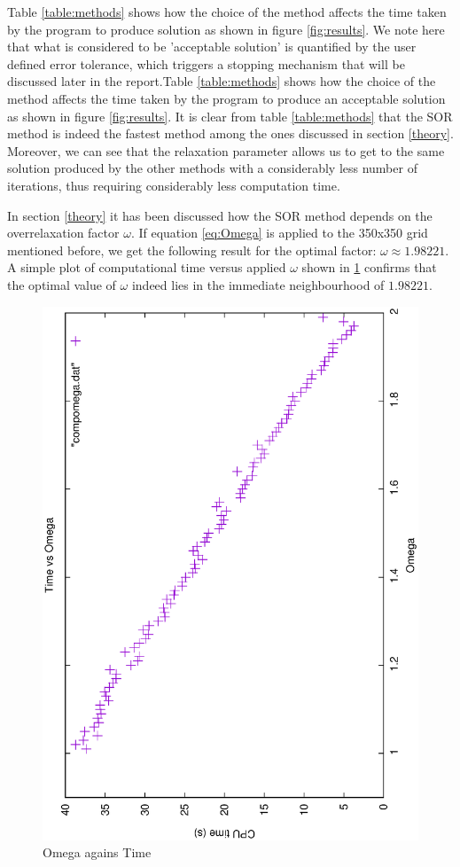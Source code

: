 \documentclass[a4paper]{article}
\begin{document}
Table \ref{table:methods} shows how the choice of the method affects the time taken by the program to produce solution as shown in figure \ref{fig:results}. We note here that what is considered to be 'acceptable solution' is quantified by the user defined error tolerance, which triggers a stopping mechanism that will be discussed later in the report.Table \ref{table:methods} shows how the choice of the method affects the time taken by the program to produce an acceptable solution as shown in figure \ref{fig:results}. It is clear from table \ref{table:methods} that the SOR method is indeed the fastest method among the ones discussed in section \ref{theory}. Moreover, we can see that the relaxation parameter allows us to get to the same solution produced by the other methods with a considerably less number of iterations, thus requiring considerably less computation time.

In section \ref{theory} it has been discussed how the SOR method depends on the overrelaxation factor $\omega$. If equation \ref{eq:Omega} is applied to the 350x350 grid mentioned before, we get the following result for the optimal factor: $\omega \approx 1.98221$. A simple plot of computational time versus applied $\omega$ shown in \ref{fig:omega} confirms that the optimal value of $\omega$ indeed lies in the immediate neighbourhood of  $1.98221$.

\begin{figure}[h!]
\centering
\includegraphics[scale=0.35,angle=-90]{compomega}
\caption{Omega agains Time}
\label{fig:omega}
\end{figure}
\end{document}
